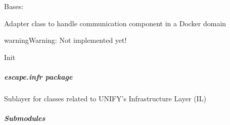 \documentclass[letterpaper,10pt,english]{sphinxmanual}
\begin{document}

\begin{fulllineitems}
\label{adapt/domain_adapters:escape.adapt.domain_adapters.DockerDomainManager}
Bases: {\hyperref[util/adapter:escape.util.adapter.AbstractDomainManager]{\emph{}}}

Adapter class to handle communication component in a Docker domain

\begin{notice}{warning}{Warning:}
Not implemented yet!
\end{notice}

\begin{fulllineitems}
\label{adapt/domain_adapters:escape.adapt.domain_adapters.DockerDomainManager.name}
\end{fulllineitems}


\begin{fulllineitems}
\label{adapt/domain_adapters:escape.adapt.domain_adapters.DockerDomainManager.__init__}
Init

\end{fulllineitems}


\begin{fulllineitems}
\label{adapt/domain_adapters:escape.adapt.domain_adapters.DockerDomainManager.install_nffg}
\end{fulllineitems}


\end{fulllineitems}



\subparagraph{\emph{escape.infr} package}
\label{infr/infr:module-escape.infr}\label{infr/infr::doc}\label{infr/infr:escape-infr-package}
Sublayer for classes related to UNIFY's Infrastructure Layer (IL)


\subparagraph{Submodules}
\label{infr/infr:submodules}
\end{document}
